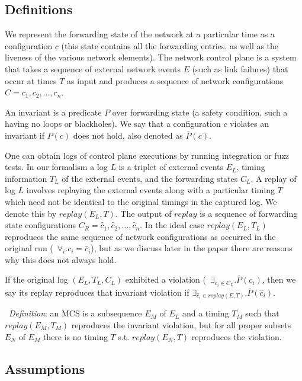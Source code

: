 \subsection{Definitions}

We represent the forwarding state of the network
at a particular time as a configuration $c$ (this state contains all the forwarding entries, as well as the liveness of the various network elements).
The network control plane is a system that takes a sequence of
external network events $E$ (such as link failures) that occur at times $T$
as input and produces a sequence of network configurations
$C = c_1,c_2,\dots,c_n$.

An invariant is a predicate $P$ over forwarding state (a safety
condition, such a having no loops or blackholes). We say that a configuration
$c$ violates an invariant if $P(c)$ does not
hold, also denoted as $\overline{P}(c)$.

One can obtain logs of control plane executions by running integration or fuzz
tests. In our formalism a log $L$ is a triplet of external events $E_L$,
timing information $T_L$ of the external events, and the forwarding states
$C_L$. A replay of log $L$ involves replaying the external events along with a particular timing $T$
which need not be identical to the original timings in the captured log.
We denote this by $replay(E_L,T)$.
The output of $replay$ is a sequence of forwarding state configurations
$C_R = \hat{c}_1,\hat{c}_2,\dots,\hat{c}_n$. In the ideal case $replay(E_L,T_L)$ reproduces the same
sequence of network configurations as occurred in the original run
(\ie~$\forall_i. c_i = \hat{c}_i$), but as we discuss later in the paper there are reasons why
this does not always hold.

If the original log $(E_L, T_L, C_L)$ exhibited a violation
(\ie~$\exists_{c_i \in C_L}. \overline{P}(c_i)$,
then we say its replay reproduces that invariant violation if
$\exists_{\hat{c}_i \in replay(E,T)}. \overline{P}(\hat{c}_i)$.

\noindent~{\em Definition}: an MCS is a subsequence $E_M$ of $E_L$ and a timing $T_M$ such
that $replay(E_M,T_M)$ reproduces the invariant violation, but for all proper
subsets $E_N$ of $E_M$
there is no timing $T$ s.t. $replay(E_N,T)$ reproduces the violation.
\\

\subsection{Assumptions}

